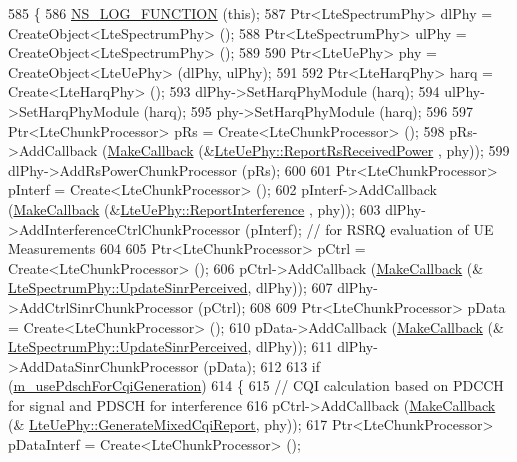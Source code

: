\begin{DoxyCode}
585 \{
586   \hyperlink{log-macros-disabled_8h_a90b90d5bad1f39cb1b64923ea94c0761}{NS\_LOG\_FUNCTION} (\textcolor{keyword}{this});
587   Ptr<LteSpectrumPhy> dlPhy = CreateObject<LteSpectrumPhy> ();
588   Ptr<LteSpectrumPhy> ulPhy = CreateObject<LteSpectrumPhy> ();
589 
590   Ptr<LteUePhy> phy = CreateObject<LteUePhy> (dlPhy, ulPhy);
591 
592   Ptr<LteHarqPhy> harq = Create<LteHarqPhy> ();
593   dlPhy->SetHarqPhyModule (harq);
594   ulPhy->SetHarqPhyModule (harq);
595   phy->SetHarqPhyModule (harq);
596 
597   Ptr<LteChunkProcessor> pRs = Create<LteChunkProcessor> ();
598   pRs->AddCallback (\hyperlink{group__makecallbackmemptr_ga9376283685aa99d204048d6a4b7610a4}{MakeCallback} (&\hyperlink{classns3_1_1LteUePhy_aca025f112e83d159f7a1b0fb822d77b6}{LteUePhy::ReportRsReceivedPower}
      , phy));
599   dlPhy->AddRsPowerChunkProcessor (pRs);
600 
601   Ptr<LteChunkProcessor> pInterf = Create<LteChunkProcessor> ();
602   pInterf->AddCallback (\hyperlink{group__makecallbackmemptr_ga9376283685aa99d204048d6a4b7610a4}{MakeCallback} (&\hyperlink{classns3_1_1LteUePhy_aac25482ac025b043e7d0516927984720}{LteUePhy::ReportInterference}
      , phy));
603   dlPhy->AddInterferenceCtrlChunkProcessor (pInterf); \textcolor{comment}{// for RSRQ evaluation of UE Measurements}
604 
605   Ptr<LteChunkProcessor> pCtrl = Create<LteChunkProcessor> ();
606   pCtrl->AddCallback (\hyperlink{group__makecallbackmemptr_ga9376283685aa99d204048d6a4b7610a4}{MakeCallback} (&
      \hyperlink{classns3_1_1LteSpectrumPhy_a81e55daa6bf70765f7e7ff7cca0faed9}{LteSpectrumPhy::UpdateSinrPerceived}, dlPhy));
607   dlPhy->AddCtrlSinrChunkProcessor (pCtrl);
608 
609   Ptr<LteChunkProcessor> pData = Create<LteChunkProcessor> ();
610   pData->AddCallback (\hyperlink{group__makecallbackmemptr_ga9376283685aa99d204048d6a4b7610a4}{MakeCallback} (&
      \hyperlink{classns3_1_1LteSpectrumPhy_a81e55daa6bf70765f7e7ff7cca0faed9}{LteSpectrumPhy::UpdateSinrPerceived}, dlPhy));
611   dlPhy->AddDataSinrChunkProcessor (pData);
612 
613   \textcolor{keywordflow}{if} (\hyperlink{classns3_1_1LteHelper_abbc3c36de95dcca35d9516c7882104f6}{m\_usePdschForCqiGeneration})
614     \{
615       \textcolor{comment}{// CQI calculation based on PDCCH for signal and PDSCH for interference}
616       pCtrl->AddCallback (\hyperlink{group__makecallbackmemptr_ga9376283685aa99d204048d6a4b7610a4}{MakeCallback} (&
      \hyperlink{classns3_1_1LteUePhy_afdd5a3c3b8a0a7bc8996254bd693e0de}{LteUePhy::GenerateMixedCqiReport}, phy));
617       Ptr<LteChunkProcessor> pDataInterf = Create<LteChunkProcessor> ();      

\end{DoxyCode}
